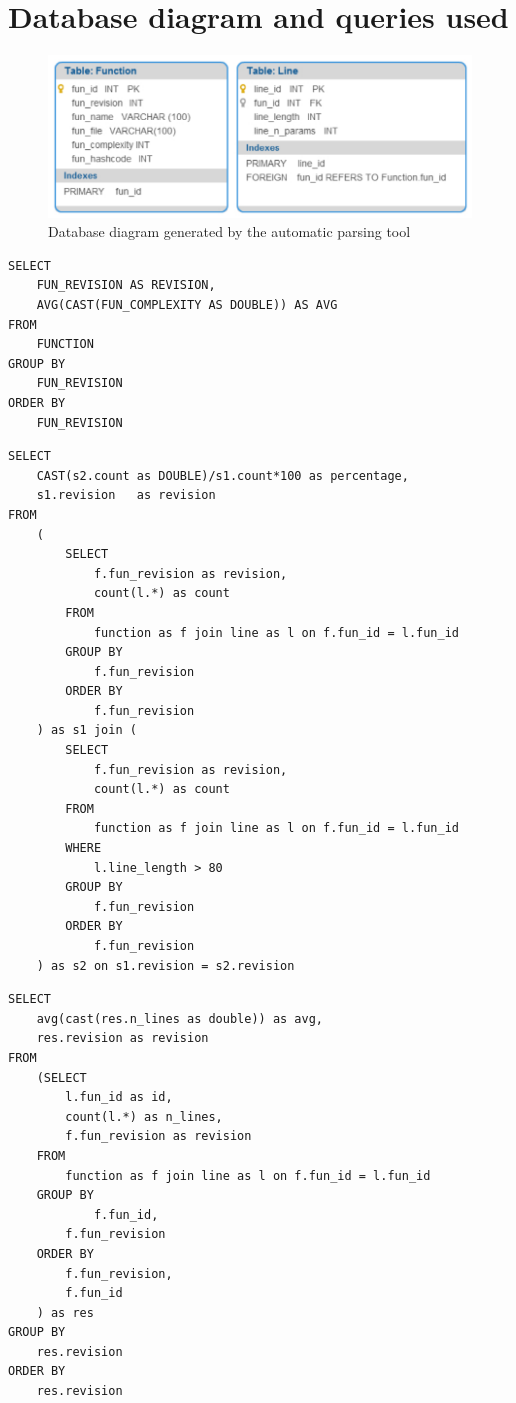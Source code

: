 \chapter{Database diagram and queries used}

\begin{figure}[!htbp]
    \centering
    \includegraphics[width=\textwidth,keepaspectratio]{figure/methods/database_diagram.pdf}
    \caption{Database diagram generated by the automatic parsing tool}
    \label{fig:database_diagram}
\end{figure}

\begin{listing}[htbp]
\begin{verbatim}
SELECT 
    FUN_REVISION AS REVISION,
    AVG(CAST(FUN_COMPLEXITY AS DOUBLE)) AS AVG
FROM 
    FUNCTION 
GROUP BY 
    FUN_REVISION 
ORDER BY 
    FUN_REVISION
\end{verbatim}
\caption{Query to calculate the revision based average complexity}
\label{listing:avg_complexity_query}
\end{listing}

\begin{listing}[htbp]
\begin{verbatim}
SELECT
    CAST(s2.count as DOUBLE)/s1.count*100 as percentage,
    s1.revision   as revision
FROM
	(
		SELECT 
		    f.fun_revision as revision,
		    count(l.*) as count
		FROM
		    function as f join line as l on f.fun_id = l.fun_id
		GROUP BY
			f.fun_revision
		ORDER BY  
			f.fun_revision
	) as s1 join (
		SELECT 
		    f.fun_revision as revision,
		    count(l.*) as count
		FROM
		    function as f join line as l on f.fun_id = l.fun_id
		WHERE 
			l.line_length > 80
		GROUP BY  
			f.fun_revision
		ORDER BY  
			f.fun_revision
	) as s2 on s1.revision = s2.revision
\end{verbatim}
\caption{Query to calculate the percentage of complex statements on a revision basis}
\label{listing:percentage_complex_statements}
\end{listing}


\begin{listing}[htbp]
\begin{verbatim}
SELECT
	avg(cast(res.n_lines as double)) as avg,
	res.revision as revision
FROM
	(SELECT
		l.fun_id as id, 
		count(l.*) as n_lines, 
		f.fun_revision as revision
	FROM
		function as f join line as l on f.fun_id = l.fun_id
	GROUP BY
	        f.fun_id,
		f.fun_revision
	ORDER BY
		f.fun_revision,
		f.fun_id
	) as res
GROUP BY 
	res.revision
ORDER BY
	res.revision
\end{verbatim}
\caption{Query to calculate the average function length (LOC) on a commit basis}
\label{listing:avg_length_query}
\end{listing}